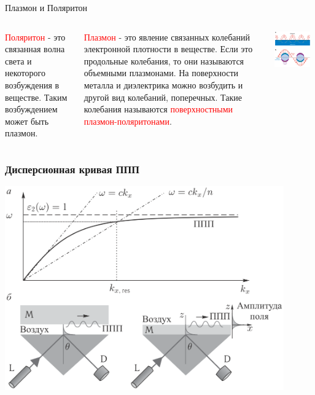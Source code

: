 \documentclass[9pt, compress, xcolor=table]{beamer}
\begin{document}
\begin{frame}{Плазмон и Поляритон}

\begin{columns}
\column{5cm}
{\small \textcolor{red}{Поляритон} - это связанная волна света и некоторого возбуждения в веществе. Таким возбуждением может быть плазмон.

\textcolor{red}{Плазмон} - это явление связанных колебаний электронной плотности в веществе. Если это продольные колебания, то они называются объемными плазмонами. На поверхности металла и диэлектрика можно возбудить и другой вид колебаний, поперечных. Такие колебания называются \textcolor{red}{поверхностными плазмон-поляритонами}.}
\column{7cm}
\begin{center}
\includegraphics[width=0.9\textwidth]{spp_nanosphere}
\end{center}
\end{columns}
\end{frame}


\begin{frame}[fragile]
\frametitle{Дисперсионная кривая ППП}

\begin{center}
\includegraphics[width=0.9\textwidth]{plasmon}
\end{center}

\end{frame}
\end{document}
